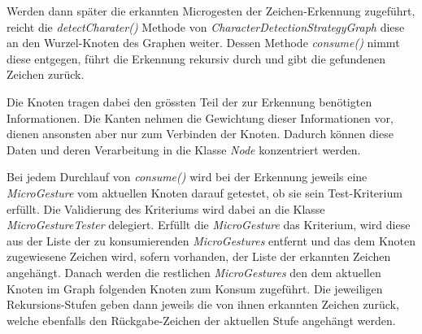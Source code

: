 Werden dann später die erkannten Microgesten der Zeichen-Erkennung zugeführt, reicht die \emph{detectCharater()} Methode von \emph{CharacterDetectionStrategyGraph} diese an den Wurzel-Knoten des Graphen weiter. Dessen Methode \emph{consume()} nimmt diese entgegen, führt die Erkennung rekursiv durch und gibt die gefundenen Zeichen zurück.

Die Knoten tragen dabei den grössten Teil der zur Erkennung benötigten Informationen. Die Kanten nehmen die Gewichtung dieser Informationen vor, dienen ansonsten aber nur zum Verbinden der Knoten. Dadurch können diese Daten und deren Verarbeitung in die Klasse \emph{Node} konzentriert werden. 

Bei jedem Durchlauf von \emph{consume()} wird bei der Erkennung jeweils eine \emph{MicroGesture} vom aktuellen Knoten darauf getestet, ob sie sein Test-Kriterium erfüllt. Die Validierung des Kriteriums wird dabei an die Klasse \emph{MicroGestureTester} delegiert. Erfüllt die \emph{MicroGesture} das Kriterium, wird diese aus der Liste der zu konsumierenden \emph{MicroGestures} entfernt und das dem Knoten zugewiesene Zeichen wird, sofern vorhanden, der Liste der erkannten Zeichen angehängt. Danach werden die restlichen \emph{MicroGestures} den dem aktuellen Knoten im Graph folgenden Knoten zum Konsum zugeführt. Die jeweiligen Rekursions-Stufen geben dann jeweils die von ihnen erkannten Zeichen zurück, welche ebenfalls den Rückgabe-Zeichen der aktuellen Stufe angehängt werden.

